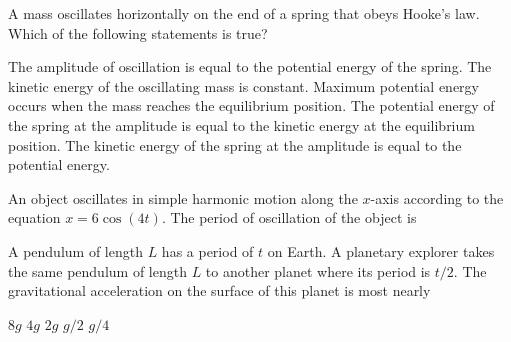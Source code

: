 \documentclass{../../../oss-apphys-exam}
\begin{document}

\raggedcolumns


\begin{questions}
  \question A mass oscillates horizontally on the end of a spring that obeys
  Hooke's law. Which of the following statements is true?
  \begin{choices}
    \choice The amplitude of oscillation is equal to the potential energy of
    the spring.
    \choice The kinetic energy of the oscillating mass is constant.
    \choice Maximum potential energy occurs when the mass reaches the
    equilibrium position.
    \choice The potential energy of the spring at the amplitude is equal to
    the kinetic energy at the equilibrium position.
    \choice The kinetic energy of the spring at the amplitude is equal to the
    potential energy.
  \end{choices}
    
    
  \question An object oscillates in simple harmonic motion along the $x$-axis
  according to the equation $x=6\cos(4t)$. The period of oscillation of the
  object is

  \question A pendulum of length $L$ has a period of $t$ on Earth. A planetary
  explorer takes the same pendulum of length $L$ to another planet where its
  period is $t/2$. The gravitational acceleration on the surface of this planet
  is most nearly
  \begin{choices}
    \choice $8g$
    \choice $4g$
    \choice $2g$
    \choice $g/2$
    \choice $g/4$
  \end{choices}


\end{questions}
\end{document}
